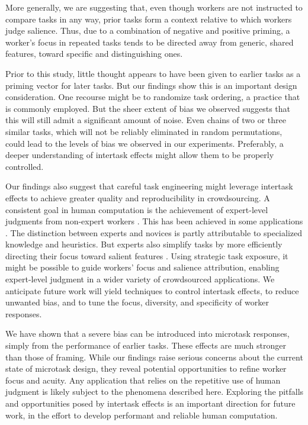 \documentclass{sigchi}
\begin{document}
More generally, we are suggesting that, even though workers are not 
instructed to compare tasks in any way, prior tasks form a 
context relative to which workers judge salience.  Thus, due to a combination 
of negative and positive priming, a worker's focus 
in repeated tasks tends to be directed away from generic, shared features, 
toward specific and distinguishing ones.

Prior to this study, little thought appears to have been given to
earlier tasks as a priming vector for later tasks.
But our findings show this is an important design consideration.  
One recourse might be to randomize task ordering, a practice that is 
commonly employed.  But the sheer extent of bias we observed suggests that 
this will still admit a significant amount of noise.  
Even chains of two or three similar tasks, which
will not be reliably eliminated in random permutations, could lead
to the levels of bias we observed in our experiments.
Preferably, a deeper understanding of intertask effects might allow them
to be properly controlled.

Our findings also suggest that careful task engineering might leverage
intertask effects to achieve greater quality and reproducibility in 
crowdsourcing.
A consistent goal in human computation is the achievement of expert-level
judgments from non-expert workers \cite{kittur2011crowdforge}.  
This has been achieved in some
applications \cite{snow2008cheap,Mortensen20131020,Warby2014385}. 
The distinction between experts and novices is partly attributable
to specialized knowledge and heuristics. 
But experts also simplify tasks by more efficiently directing 
their focus toward salient features \cite{kellman2009perceptual}.  
Using strategic task exposure, it might be possible to guide workers' focus 
and salience attribution, enabling expert-level judgment in a wider variety of
crowdsourced applications.
We anticipate future work will yield techniques to control intertask 
effects, to reduce unwanted bias, and to tune the focus, diversity, and 
specificity of worker responses.

We have shown that a severe bias can be introduced into microtask 
responses, simply from the performance of earlier tasks. 
These effects are much stronger than those of framing.  
While our findings raise serious concerns about the 
current state of microtask design, they reveal potential opportunities 
to refine worker focus and acuity.  Any application that relies
on the repetitive use of human judgment is likely subject to the phenomena
described here.  Exploring the pitfalls and opportunities posed by
intertask effects is an important direction for future work, 
in the effort to develop performant and reliable human computation.
\end{document}
